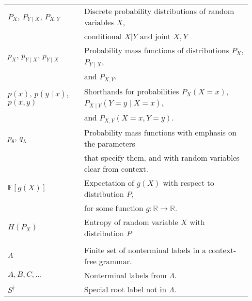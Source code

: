 \documentclass[11pt]{article}
\begin{document}
\begin{table}[h]
\begin{tabular}{l|l}
    $P_X$, $P_{Y \mid X}$, $P_{X, Y}$ & Discrete probability distributions of random variables $X$, \\ & conditional $X \vert Y$ and joint $X, Y$ \\

    $p_{X}$, $p_{Y \mid X}$, $p_{Y \mid X}$ & Probability mass functions of distributions $P_X$, $P_{Y \mid X}$, \\ & and $P_{X, Y}$. \\

    $p(x)$, $p(y \mid x)$, $p(x, y)$ & Shorthands for probabilities $P_{X}(X = x)$, $P_{X \mid Y}(Y = y \mid X = x)$, \\ & and $P_{X, Y}(X = x, Y = y)$. \\

    $p_{\theta}$, $q_{\lambda}$ & Probability mass functions with emphasis on the parameters \\ & that specify them, and with random variables clear from context.  \\

    $\mathbb{E}[g(X)]$ & Expectation of $g(X)$ with respect to distribution $P$, \\ & for some function $g: \mathbb{R} \to \mathbb{R}$. \\

    $H(P_X)$ & Entropy of random variable $X$ with distribution $P$ \\
    & \\


    $\Lambda$ & Finite set of nonterminal labels in a context-free grammar.  \\
    $A, B, C, \dots$ & Nonterminal labels from $\Lambda$.  \\
    $S^{\dagger}$ & Special root label not in $\Lambda$.  \\



    \hline\hline
  \end{tabular}

\end{table}
\end{document}
